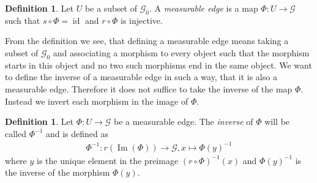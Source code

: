 \documentclass[12pt,a4paper]{scrartcl}
\theoremstyle{plain}
\theoremstyle{definition}
\newtheorem{Definition}[Theorem]{Definition}
\numberwithin{equation}{section}
\newcommand{\2}{\mathbb{Z} / 2 \mathbb{Z}}
\newcommand{\G}{\mathcal{G}}
\newcommand{\1}{\bar{1}}
\newcommand{\0}{\bar{0}}
\newcommand{\id}{\operatorname{id}}
\newcommand{\Ima}{\operatorname{Im}}
\begin{document}
\begin{Definition}
	Let $U$ be a subset of $\G_0$. A \emph{measurable edge} is a map $\Phi\colon U \to \G$ such that $s \circ \Phi = \id$ and $r \circ \Phi$ is injective.
\end{Definition}
From the definition we see, that defining a measurable edge means taking a subset of $\G_0$ and associating a morphism to every object such that the morphism starts in this object and no two such morphisms end in the same object. We want to define the inverse of a measurable edge in such a way, that it is also a measurable edge. Therefore it does not suffice to take the inverse of the map $\Phi$. Instead we invert each morphism in the image of $\Phi$.
\begin{Definition}
	Let $\Phi\colon U \to \G$ be a measurable edge. The \emph{inverse} of $\Phi$ will be called $\Phi^{-1}$ and is defined as \begin{align*}
		\Phi^{-1}\colon r(\Ima(\Phi)) \to \G, x \mapsto \Phi (y)^{-1}
	\end{align*}
	where $y$ is the unique element in the preimage $(r \circ \Phi)^{-1} (x)$ and $\Phi (y)^{-1}$ is the inverse of the morphism $\Phi (y)$.
\end{Definition}
\end{document}
